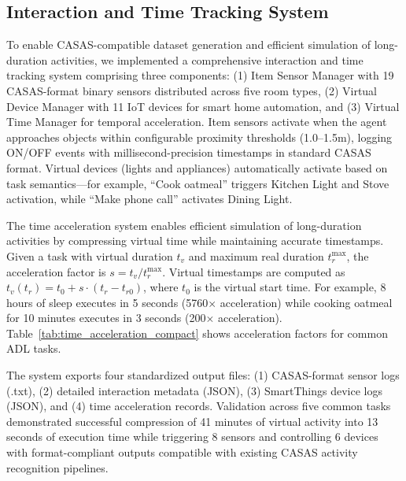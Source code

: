 
\subsection{Interaction and Time Tracking System}

To enable CASAS-compatible dataset generation and efficient simulation of long-duration activities, we implemented a comprehensive interaction and time tracking system comprising three components: (1) Item Sensor Manager with 19 CASAS-format binary sensors distributed across five room types, (2) Virtual Device Manager with 11 IoT devices for smart home automation, and (3) Virtual Time Manager for temporal acceleration. Item sensors activate when the agent approaches objects within configurable proximity thresholds (1.0--1.5m), logging ON/OFF events with millisecond-precision timestamps in standard CASAS format. Virtual devices (lights and appliances) automatically activate based on task semantics—for example, ``Cook oatmeal'' triggers Kitchen Light and Stove activation, while ``Make phone call'' activates Dining Light.

The time acceleration system enables efficient simulation of long-duration activities by compressing virtual time while maintaining accurate timestamps. Given a task with virtual duration $t_v$ and maximum real duration $t_r^{\max}$, the acceleration factor is $s = t_v/t_r^{\max}$. Virtual timestamps are computed as $t_v(t_r) = t_0 + s \cdot (t_r - t_{r0})$, where $t_0$ is the virtual start time. For example, 8 hours of sleep executes in 5 seconds (5760$\times$ acceleration) while cooking oatmeal for 10 minutes executes in 3 seconds (200$\times$ acceleration). Table~\ref{tab:time_acceleration_compact} shows acceleration factors for common ADL tasks.

The system exports four standardized output files: (1) CASAS-format sensor logs (.txt), (2) detailed interaction metadata (JSON), (3) SmartThings device logs (JSON), and (4) time acceleration records. Validation across five common tasks demonstrated successful compression of 41 minutes of virtual activity into 13 seconds of execution time while triggering 8 sensors and controlling 6 devices with format-compliant outputs compatible with existing CASAS activity recognition pipelines.

